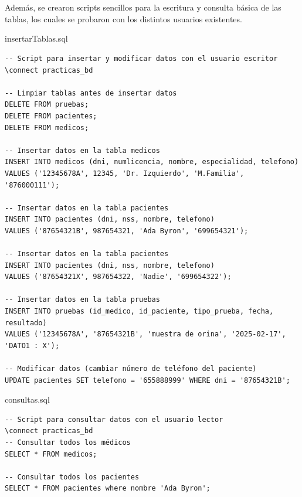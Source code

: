 \documentclass{article}
\begin{document}
\newline
\\ \\ 
Además, se crearon scripts sencillos para la escritura y consulta básica de las tablas, los cuales se probaron con los distintos usuarios existentes.
\begin{scriptbox}{insertarTablas.sql}
\begin{verbatim}
-- Script para insertar y modificar datos con el usuario escritor
\connect practicas_bd

-- Limpiar tablas antes de insertar datos
DELETE FROM pruebas;
DELETE FROM pacientes;
DELETE FROM medicos;

-- Insertar datos en la tabla medicos
INSERT INTO medicos (dni, numlicencia, nombre, especialidad, telefono)
VALUES ('12345678A', 12345, 'Dr. Izquierdo', 'M.Familia', '876000111');

-- Insertar datos en la tabla pacientes
INSERT INTO pacientes (dni, nss, nombre, telefono)
VALUES ('87654321B', 987654321, 'Ada Byron', '699654321');

-- Insertar datos en la tabla pacientes
INSERT INTO pacientes (dni, nss, nombre, telefono)
VALUES ('87654321X', 987654322, 'Nadie', '699654322');

-- Insertar datos en la tabla pruebas
INSERT INTO pruebas (id_medico, id_paciente, tipo_prueba, fecha, resultado)
VALUES ('12345678A', '87654321B', 'muestra de orina', '2025-02-17', 'DATO1 : X');

-- Modificar datos (cambiar número de teléfono del paciente)
UPDATE pacientes SET telefono = '655888999' WHERE dni = '87654321B';

\end{verbatim}
\end{scriptbox}

\begin{scriptbox}{consultas.sql}
\begin{verbatim}
-- Script para consultar datos con el usuario lector
\connect practicas_bd
-- Consultar todos los médicos
SELECT * FROM medicos;

-- Consultar todos los pacientes
SELECT * FROM pacientes where nombre 'Ada Byron';
\end{verbatim}
\end{scriptbox}
\end{document}
